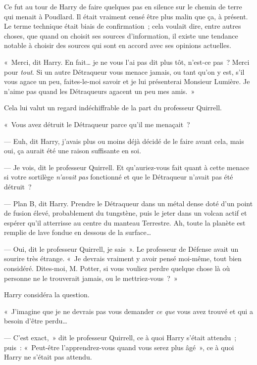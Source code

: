Ce fut au tour de Harry de faire quelques pas en silence sur le chemin de terre qui menait à Poudlard. Il était vraiment censé être plus malin que ça, à présent. Le terme technique était biais de confirmation~; cela voulait dire, entre autres choses, que quand on choisit ses sources d'information, il existe une tendance notable à choisir des sources qui sont en accord avec ses opinions actuelles.

«~Merci, dit Harry. En fait… je ne vous l'ai pas dit plus tôt, n'est-ce pas~? Merci pour \emph{tout}. Si un autre Détraqueur vous menace jamais, ou tant qu'on y est, s'il vous agace un peu, faites-le-moi savoir et je lui présenterai Monsieur Lumière. Je n'aime pas quand les Détraqueurs agacent un peu mes amis.~»

Cela lui valut un regard indéchiffrable de la part du professeur Quirrell.

«~Vous avez détruit le Détraqueur parce qu'il me menaçait~?

--- Euh, dit Harry, j'avais plus ou moins déjà décidé de le faire avant cela, mais oui, ça aurait été une raison suffisante en soi.

--- Je vois, dit le professeur Quirrell. Et qu'auriez-vous fait quant à cette menace si votre sortilège \emph{n'avait} \emph{pas} fonctionné et que le Détraqueur n'avait pas été détruit~?

--- Plan B, dit Harry. Prendre le Détraqueur dans un métal dense doté d'un point de fusion élevé, probablement du tungstène, puis le jeter dans un volcan actif et espérer qu'il atterrisse au centre du manteau Terrestre. Ah, toute la planète est remplie de lave fondue en dessous de la surface…

--- Oui, dit le professeur Quirrell, je sais~». Le professeur de Défense avait un sourire très étrange. «~Je devrais vraiment y avoir pensé moi-même, tout bien considéré. Dites-moi, M. Potter, si vous vouliez perdre quelque chose là où personne ne le trouverait jamais, ou le mettriez-vous~?~»

Harry considéra la question.

«~J'imagine que je ne devrais pas vous demander \emph{ce que} vous avez trouvé et qui a besoin d'être perdu…

--- C'est exact,~» dit le professeur Quirrell, ce à quoi Harry s'était attendu~; puis~: «~Peut-être l'apprendrez-vous quand vous serez plus âgé~», ce à quoi Harry ne s'était pas attendu.

